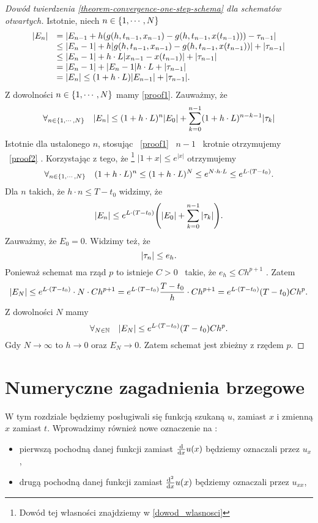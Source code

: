 \documentclass[12pt,a4paper]{report}
\begin{document}
\begin{proof}[Dowód twierdzenia \ref{theorem-convergence-one-step-schema} dla schematów otwartych]
Istotnie, niech $n \in \set{1,\cdots,N} $ 
\begin{equation}
\begin{array}{rl}
\abs{E_n} &= \abs{E_{n-1} + h(g(h,t_{n-1},x_{n-1}) - g(h,t_{n-1},x(t_{n-1}))) - \tau_{n-1}} \\
&\leq \abs{E_n-1} + h \abs{g(h,t_{n-1},x_{n-1}) - g(h,t_{n-1},x(t_{n-1}))} + \abs{ \tau_{n-1}}\\
&\leq \abs{E_n-1} + h \cdot L \abs{x_{n-1} - x(t_{n-1})} + \abs{ \tau_{n-1}}\\
&= \abs{E_n-1} + \abs{E_n-1} h \cdot L + \abs{ \tau_{n-1}}\\
&= \abs{E_n} \leq (1 + h \cdot L) \abs{E_{n-1}} + \abs{\tau_{n-1}} .
\end{array}
\end{equation}
Z dowolności $n \in \set{1, \cdots, N}$ mamy \eqref{proof1}. 
Zauważmy, że 
\begin{equation} \label{proof2}
\forall_{n \in \set{1,\cdots,N}} \quad \abs{E_n} \leq (1 + h \cdot L)^{n} \abs{E_0} + \sum_{k=0}^{n-1} (1+ h \cdot L)^{n-k-1} \abs{\tau_k} 
\end{equation}
Istotnie dla ustalonego $n$, stosując \  \eqref{proof1} \  $n-1$ \  krotnie otrzymujemy \ \eqref{proof2} . Korzystając z tego, że \footnote{Dowód tej własności znajdziemy w \ref{dowod_wlasnosci}} $|1+x|\leqslant e^{|x|}$ otrzymujemy
$$
\forall_{n \in \set{1,\cdots,N}} \quad (1 + h \cdot L)^{n} \leq (1 + h \cdot L)^{N} \leq e^{N \cdot h \cdot L} \leq e^{L \cdot (T-t_0)} .
$$
Dla $n$ takich, że $h\cdot n\leq  T - t_0 $ widzimy, że
$$
\abs{E_n} \leq e^{L \cdot (T-t_0)} \bracket{\abs{E_0} + \sum_{k=0}^{n-1}\abs{\tau_k}}.
$$
Zauważmy, że $E_0 = 0$. Widzimy też, że 
$$
\abs{\tau_n} \leq e_h.
$$
Ponieważ schemat ma rząd $p$ to istnieje  $C>0$ \ takie, że $e_h \leq Ch^{p+1} $ . Zatem
$$
\abs{E_N} \leq  e^{L \cdot (T-t_0)} \cdot N \cdot Ch^{p+1}
= e^{L \cdot (T-t_0)} \frac{T-t_0}{h} \cdot Ch^{p+1}
= e^{L \cdot (T-t_0)} (T-t_0) Ch^p.
$$
Z dowolności $N$ mamy
$$
\forall_{N \in \setN} \quad \abs{E_N} \leq e^{L \cdot (T-t_0)} (T-t_0) Ch^p.
$$
Gdy $ N \to \infty $ to $ h \to 0 $ oraz $ E_N \to 0$. Zatem schemat jest zbieżny z rzędem $p$.
\end{proof}
\chapter{Numeryczne zagadnienia brzegowe}
W tym rozdziale będziemy posługiwali się funkcją szukaną $u$, zamiast $x$ i zmienną $x$ zamiast $t$. Wprowadzimy również nowe oznaczenie na :
\begin{itemize}
\item pierwszą pochodną danej funkcji zamiast $\ddx{x} u(x) $ będziemy oznaczali przez $u_{x}$,
\item drugą pochodną danej funkcji zamiast $\ddx[^2]{x} u(x)$ będziemy oznaczali przez $u_{xx}$,
\end{itemize}
\end{document}
